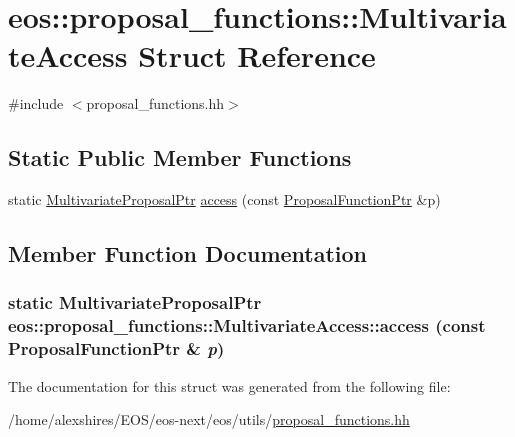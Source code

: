 \hypertarget{structeos_1_1proposal__functions_1_1MultivariateAccess}{
\section{eos::proposal\_\-functions::MultivariateAccess Struct Reference}
\label{structeos_1_1proposal__functions_1_1MultivariateAccess}
}


{\ttfamily \#include $<$proposal\_\-functions.hh$>$}\subsection*{Static Public Member Functions}
\begin{DoxyCompactItemize}
\item 
static \hyperlink{namespaceeos_1_1proposal__functions_a6cffa18d523cd6955629beabbe07c17c}{MultivariateProposalPtr} \hyperlink{structeos_1_1proposal__functions_1_1MultivariateAccess_af0f5d90cc58f31b1bfa4e3bdc5d598b6}{access} (const \hyperlink{namespaceeos_ae97f9891c67c90959a03fc96efaa4dc9}{ProposalFunctionPtr} \&p)
\end{DoxyCompactItemize}


\subsection{Member Function Documentation}
\hypertarget{structeos_1_1proposal__functions_1_1MultivariateAccess_af0f5d90cc58f31b1bfa4e3bdc5d598b6}{
\subsubsection[{access}]{\setlength{\rightskip}{0pt plus 5cm}static {\bf MultivariateProposalPtr} eos::proposal\_\-functions::MultivariateAccess::access (const {\bf ProposalFunctionPtr} \& {\em p})}}
\label{structeos_1_1proposal__functions_1_1MultivariateAccess_af0f5d90cc58f31b1bfa4e3bdc5d598b6}


The documentation for this struct was generated from the following file:\begin{DoxyCompactItemize}
\item 
/home/alexshires/EOS/eos-\/next/eos/utils/\hyperlink{proposal__functions_8hh}{proposal\_\-functions.hh}\end{DoxyCompactItemize}
